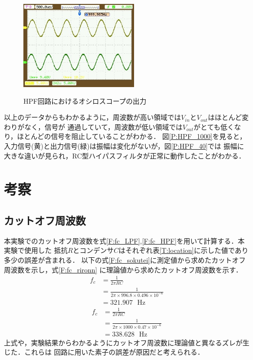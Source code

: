 \documentclass[a4paper,11pt]{jsarticle}
\begin{document}
\begin{figure}[H]
\begin{center}
\begin{minipage}{0.48\textwidth}
      \label{P:HPF_500}
    \end{minipage}
    \begin{minipage}{0.48\textwidth}
      \begin{center}
        \includegraphics[clip,width=6cm]{picture/HPF/1000.jpeg}
      \end{center}
      \label{P:HPF_1000}
    \end{minipage}
    \caption{HPF回路におけるオシロスコープの出力}
    \label{P:Scope_HPF}
  \end{center}
\end{figure}
以上のデータからもわかるように，周波数が高い領域では$V_{in}とV_{out}$はほとんど変わりがなく，信号が
通過していて，周波数が低い領域では$V_{out}$がとても低くなり，ほとんどの信号を阻止していることがわかる．
図\ref{P:HPF_1000}を見ると，入力信号(黄)と出力信号(緑)は振幅は変化がないが，図\ref{P:HPF_40}では
振幅に大きな違いが見られ，RC型ハイパスフィルタが正常に動作したことがわかる．

\section{考察}
\subsection{カットオフ周波数}
本実験でのカットオフ周波数を式\ref{F:fc_LPF},\ref{F:fc_HPF}を用いて計算する．本実験で使用した
抵抗$R$とコンデンサ$C$はそれぞれ表\ref{T:location}に示した値であり多少の誤差が含まれる．
以下の式\ref{F:fc_sokutei}に測定値から求めたカットオフ周波数を示し，式\ref{F:fc_rironn}
に理論値から求めたカットオフ周波数を示す．
\begin{align}
  f_c & = \frac{1}{2\pi RC}                                       \nonumber \\
      & = \frac{1}{2\pi \times 996.8 \times 0.496 \times 10^{-6}} \nonumber \\
      & = 321.907 \ \ \ \si{\hertz} \label{F:fc_sokutei}
\end{align}
\begin{align}
  f_c & = \frac{1}{2\pi RC}                                     \nonumber \\
      & = \frac{1}{2\pi \times 1000 \times 0.47 \times 10^{-6}} \nonumber \\
      & = 338.628 \ \ \ \si{\hertz} \label{F:fc_rironn}
\end{align}
上式や，実験結果からわかるようにカットオフ周波数に理論値と異なるズレが生じた．これらは
回路に用いた素子の誤差が原因だと考えられる．
\end{document}
